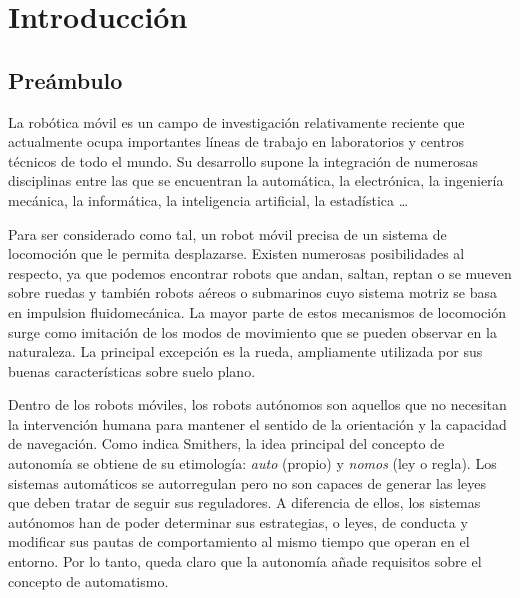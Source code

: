 
\chapter{Introducción}

\section{Preámbulo}

La robótica móvil es un campo de investigación relativamente reciente que actualmente ocupa importantes líneas de trabajo en laboratorios y centros técnicos de todo el mundo. Su desarrollo supone la integración de numerosas disciplinas entre las que se encuentran la automática, la electrónica, la ingeniería mecánica, la informática, la inteligencia artificial, la estadística \ldots

Para ser considerado como tal, un robot móvil precisa de un sistema de locomoción que le permita desplazarse. Existen numerosas posibilidades al respecto, ya que podemos encontrar robots que andan, saltan, reptan o se mueven sobre ruedas y también robots aéreos o submarinos cuyo sistema motriz se basa en impulsion fluidomecánica. La mayor parte de estos mecanismos de locomoción surge como imitación de los modos de movimiento que se pueden observar en la naturaleza. La principal excepción es la rueda, ampliamente utilizada por sus buenas características sobre suelo plano.

Dentro de los robots móviles, los robots autónomos son aquellos que no necesitan la intervención humana para mantener el sentido de la orientación y la capacidad de navegación. Como indica Smithers, la idea principal del concepto de autonomía se obtiene de su etimología: \emph{auto} (propio) y \emph{nomos} (ley o regla). Los sistemas automáticos se autorregulan pero no son capaces de generar las leyes que deben tratar de seguir sus reguladores. A diferencia de ellos, los sistemas autónomos han de poder determinar sus estrategias, o leyes, de conducta y modificar sus pautas de comportamiento al mismo tiempo que operan en el entorno. Por lo tanto, queda claro que la autonomía añade requisitos sobre el concepto de automatismo.

